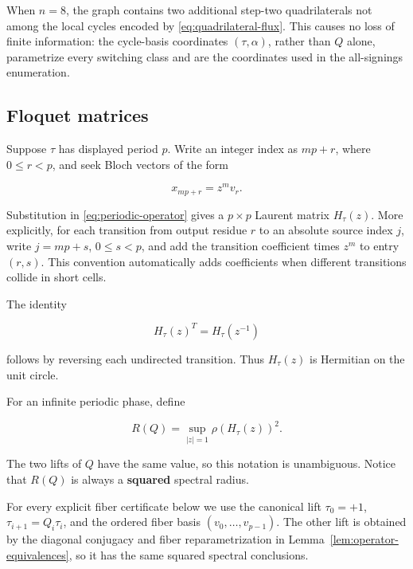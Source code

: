 When \(n=8\), the graph contains two additional step-two quadrilaterals not
among the local cycles encoded by \eqref{eq:quadrilateral-flux}. This causes no loss of finite
information: the cycle-basis coordinates \((\tau,\alpha)\), rather than \(Q\) alone,
parametrize every switching class and are the coordinates used in the
all-signings enumeration.

\subsection{Floquet matrices}\label{subsec:floquet-matrices}

Suppose \(\tau\) has displayed period \(p\). Write an integer index as \(mp+r\),
where \(0\leq r<p\), and seek Bloch vectors of the form

\begin{equation}
x_{mp+r}=z^m v_r.
\end{equation}

Substitution in \eqref{eq:periodic-operator} gives a \(p\times p\) Laurent matrix \(H_\tau(z)\). More
explicitly, for each transition from output residue \(r\) to an absolute source
index \(j\), write \(j=mp+s\), \(0\leq s<p\), and add the transition coefficient times
\(z^m\) to entry \((r,s)\). This convention automatically adds coefficients when
different transitions collide in short cells.

The identity

\begin{equation}
\label{eq:fiber-transpose}
H_\tau(z)^T=H_\tau(z^{-1})
\end{equation}

follows by reversing each undirected transition. Thus \(H_\tau(z)\) is Hermitian
on the unit circle.

For an infinite periodic phase, define

\begin{equation}
\label{eq:squared-periodic-radius}
R(Q)=\sup_{\lvert z\rvert=1} \rho(H_\tau(z))^{2}.
\end{equation}

The two lifts of \(Q\) have the same value, so this notation is unambiguous.
Notice that \(R(Q)\) is always a \textbf{squared} spectral radius.

For every explicit fiber certificate below we use the canonical lift
\(\tau_{0}=+1\), \(\tau_{i+1}=Q_i \tau_i\), and the ordered fiber basis
\((v_{0},\ldots,v_{p-1})\). The other lift is obtained by the diagonal conjugacy and
fiber reparametrization in Lemma~\ref{lem:operator-equivalences}, so it has the same squared spectral
conclusions.


